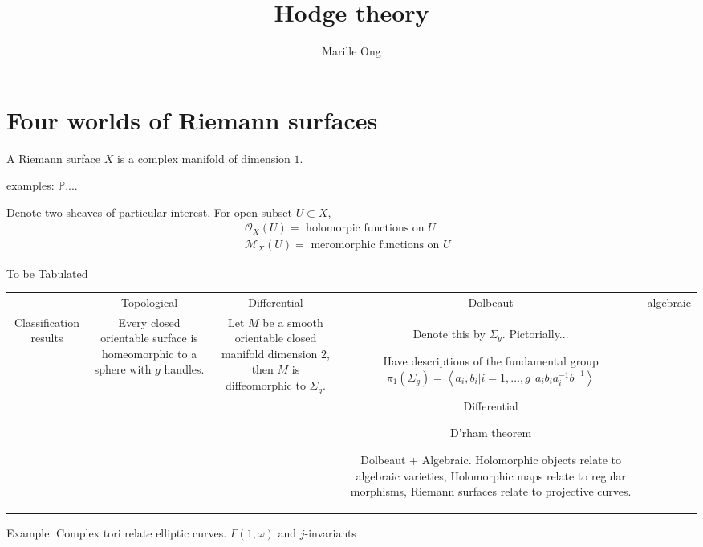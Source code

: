 % 

\title{Hodge theory}
\author{Marille Ong}
\date{}

 
\maketitle

\section{Four worlds of Riemann surfaces} %

\begin{definition}
  A Riemann surface $X$ is a complex manifold of dimension $1$.
\end{definition}

examples:
$ \mathbb{P} $.... 

Denote two sheaves of particular interest. 
For open subset $U \subset X $, 
\begin{align}
    \mathcal{O}_X ( U) =  \mbox{ holomorpic functions on $U$ } \\
    \mathcal{M}_X ( U) =  \mbox{ meromorphic functions on $U$ } 
\end{align}

To be Tabulated 

\begin{tabular*}{\textwidth}{c|cccc}
   &   Topological  & Differential & Dolbeaut & algebraic \\
    Classification results & 
    Every closed orientable surface is homeomorphic to a sphere with $g$ handles.  & 
Let $M $ be a smooth orientable closed manifold dimension $2$, 
    then $M$ is diffeomorphic to $\Sigma _g $. & 


Denote this by $\Sigma_g$. 
Pictorially...

Have descriptions of the fundamental group
    $\pi_1 ( \Sigma_g) = \left< a_i, b_i | i =1, \dots, g ~~ a_i b_i a_i^{-1} b^{-1} \right> $

Differential 

D'rham theorem 


Dolbeaut + Algebraic.
Holomorphic objects relate to algebraic varieties, 
Holomorphic maps relate to regular morphisms, 
Riemann surfaces relate to projective curves. 
\end{tabular*} 

Example: Complex tori relate elliptic curves. 
$ \Gamma( 1, \omega) $  and $j$-invariants 

